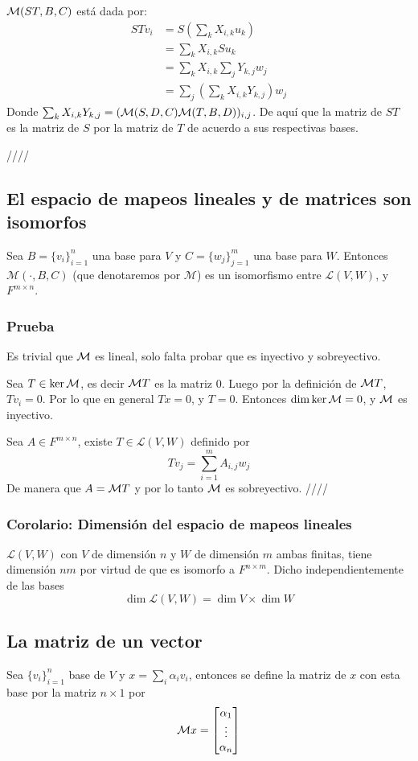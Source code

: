 \documentclass{article}
\begin{document}
$\mathcal{M}(ST,B,C)$ está dada por: 
\begin{align*}
    STv_i &= S\left(\sum_k X_{i,k}u_k\right)\\
    &= \sum_k X_{i,k} Su_k\\
    &= \sum_k X_{i,k} \sum_j Y_{k,j} w_j \\
    &= \sum_j \left(\sum_k X_{i,k} Y_{k,j}\right) w_j
\end{align*}
Donde $\sum_k X_{i,k} Y_{k,j} = (\mathcal{M}(S,D,C)\mathcal{M}(T,B,D))_{i,j}$.
De aquí que la matriz de $ST$ es la matriz de $S$ por la matriz
de $T$ de acuerdo a sus respectivas bases.

\hfill ////

\subsection{El espacio de mapeos lineales y de matrices son isomorfos}
Sea $B=\{v_i\}_{i=1}^n$ una base para $V$ y $C=\{w_j\}_{j=1}^m$ una base
para $W$. Entonces $\mathcal{M}(\cdot, B, C)$ (que denotaremos por 
$\mathcal{M}$) es un isomorfismo
entre $\mathcal{L}(V,W)$, y $F^{m\times n}$.
\subsubsection*{Prueba}
Es trivial que $\mathcal{M}$ es lineal, solo falta probar que es inyectivo y 
sobreyectivo.

Sea $T\in\ker\mathcal{M}$, es decir $\mathcal{M} T$ es la matriz $0$. Luego por la
definición de $\mathcal{M} T$, $Tv_i = 0$. Por lo que en general $Tx=0$,
y $T=0$. Entonces $\dim\ker\mathcal{M} = 0$, y $\mathcal{M}$ es inyectivo.

Sea $A\in F^{m\times n}$, existe $T\in\mathcal{L}(V,W)$ definido
por $$Tv_j = \sum^m_{i=1}A_{i,j} w_j$$
De manera que $A=\mathcal{M} T$ y por lo tanto $\mathcal{M}$ es sobreyectivo.
\hfill ////

\subsubsection{Corolario: Dimensión del espacio de mapeos lineales}
$\mathcal{L}(V,W)$ con $V$ de dimensión $n$ y $W$ de dimensión $m$
ambas finitas, tiene dimensión $nm$ por virtud de que es isomorfo a
$F^{n\times m}$. Dicho independientemente de las bases
$$\dim \mathcal{L}(V,W) = \dim V \times \dim W$$

\subsection{La matriz de un vector}
Sea $\{v_i\}_{i=1}^n$ base de $V$ y $x=\sum_i\alpha_i v_i$, 
entonces se define la matriz de $x$ con esta base por la matriz
$n\times 1$ por
$$\mathcal{M} x = \begin{bmatrix}
    \alpha_1 \\
    \vdots \\
    \alpha_n
\end{bmatrix}$$
\end{document}
